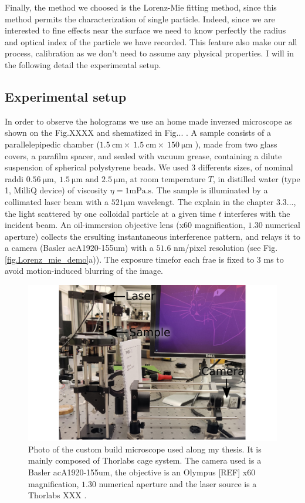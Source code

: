 Finally, the method we choosed is the Lorenz-Mie fitting method, since this method permits the characterization of single particle. Indeed, since we are interested to fine effects near the surface we need to know perfectly the radius and optical index of the particle we have recorded. This feature also make our all process, calibration as we don't need to assume any physical properties. I will in the following detail the experimental setup.


\subsection{Experimental setup}

In order to observe the holograms we use an home made inversed microscope as shown on the Fig.XXXX and shematized in Fig... . A sample consists of a parallelepipedic chamber ($1.5 ~ \text{cm} \times ~ 1.5 ~ \text{cm} \times ~ 150 ~ \mathrm{\mu m} $ ), made from two glass covers, a parafilm spacer, and sealed with vacuum grease, containing a dilute suspension of spherical polystyrene beads. We used 3 differents sizes, of nominal raddi $0.56 ~ \mathrm{\mu m}, ~ 1.5 ~ \mathrm{\mu m} \text{ and } 2.5 ~ \mathrm{\mu m} $, at room temperature $T$, in distilled water (type 1, MilliQ device) of viscosity $\eta = 1 \mathrm{mPa.s}$. The sample is illuminated by a collimated laser beam with a $521 \mathrm{\mu m}$ wavelengt. The explain in the chapter 3.3..., the light scattered by one colloidal particle at a given time $t$ interferes with the incident beam. An oil-immersion objective lens (x60 magnification, $1.30$ numerical aperture) collects the ersulting instantaneous interference pattern, and relays it to a camera (Basler acA1920-155um) with a $51.6$ nm/pixel resolution (see Fig.\ref{fig.Lorenz_mie_demo}a)). The exposure timefor each frae is fixed to $3$ ms to avoid motion-induced blurring of the image.

\begin{figure}[h!]
	\centering
	\includegraphics{02_body/chapter2/images/figures_setup/photo_setup.pdf}
	\caption{Photo of the custom build microscope used along my thesis. It is mainly composed of Thorlabs cage system. The camera used is a Basler acA1920-155um, the objective is an Olympus [REF] x60 magnification, $1.30$ numerical aperture and the laser source is a Thorlabs XXX .}
\end{figure}

